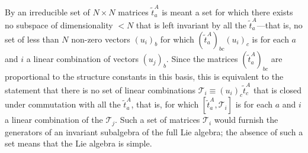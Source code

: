 By an irreducible set of $N\times N$ matrices $\widetilde t^A_a$ is meant a set for which there exists no subspace of dimensionality $<N$ that is left invariant by all the $\widetilde t^A_a$---that is, no set of less than $N$ non-zero vectors $(u_i)_b$ for which $(\widetilde t^A_a)_{bc}(u_i)_c$ is for each $a$ and $i$ a linear combination of vectors $(u_j)_b$. Since the matrices $(\widetilde t^A_a)_{bc}$ are proportional to the structure constants in this basis, this is equivalent to the statement that there is no set of linear combinations $\mathcal T_i\equiv(u_i)_c\widetilde t^A_c$ that is closed under commutation with all the $\widetilde t^A_a$, that is, for which $[\widetilde t^A_a,\mathcal T_i]$ is for each $a$ and $i$ a linear combination of the $\mathcal T_j$. Such a set of matrices $\mathcal T_i$ would furnish the generators of an invariant subalgebra of the full Lie algebra; the absence of such a set means that the Lie algebra is simple.

